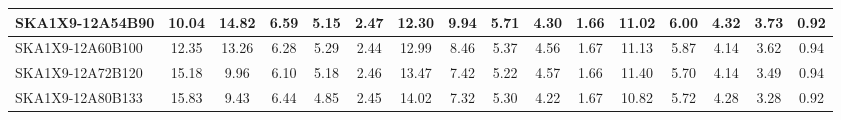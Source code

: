 \begin{table}[H]
{{\begin{tabular}{|lccccc||ccccc||ccccc|}
SKA1X9-12A54B90 & 10.04 \cellcolor{blue!21.46} & 14.82 \cellcolor{red!60.00} & 6.59 \cellcolor{green!50.16} & 5.15 \cellcolor{orange!37.09} & 2.47 \cellcolor{purple!27.69} & 12.30 \cellcolor{blue!46.00} & 9.94 \cellcolor{red!60.00} & 5.71 \cellcolor{green!60.00} & 4.30 \cellcolor{orange!23.89} & 1.66 \cellcolor{purple!18.00} & 11.02 \cellcolor{blue!56.25} & 6.00 \cellcolor{red!48.73} & 4.32 \cellcolor{green!37.38} & 3.73 \cellcolor{orange!50.59} & 0.92 \cellcolor{purple!18.00}\\ \hline 
SKA1X9-12A60B100 & 12.35 \cellcolor{blue!36.84} & 13.26 \cellcolor{red!49.03} & 6.28 \cellcolor{green!29.81} & 5.29 \cellcolor{orange!46.00} & 2.44 \cellcolor{purple!18.00} & 12.99 \cellcolor{blue!51.62} & 8.46 \cellcolor{red!36.27} & 5.37 \cellcolor{green!30.86} & 4.56 \cellcolor{orange!43.05} & 1.67 \cellcolor{purple!22.20} & 11.13 \cellcolor{blue!57.34} & 5.87 \cellcolor{red!35.41} & 4.14 \cellcolor{green!18.00} & 3.62 \cellcolor{orange!42.62} & 0.94 \cellcolor{purple!28.50}\\ \hline 
SKA1X9-12A72B120 & 15.18 \cellcolor{blue!55.67} & 9.96 \cellcolor{red!25.81} & 6.10 \cellcolor{green!18.00} & 5.18 \cellcolor{orange!39.00} & 2.46 \cellcolor{purple!24.46} & 13.47 \cellcolor{blue!55.52} & 7.42 \cellcolor{red!19.60} & 5.22 \cellcolor{green!18.00} & 4.57 \cellcolor{orange!43.79} & 1.66 \cellcolor{purple!18.00} & 11.40 \cellcolor{blue!60.00} & 5.70 \cellcolor{red!18.00} & 4.14 \cellcolor{green!18.00} & 3.49 \cellcolor{orange!33.21} & 0.94 \cellcolor{purple!28.50}\\ \hline 
SKA1X9-12A80B133 & 15.83 \cellcolor{blue!60.00} & 9.43 \cellcolor{red!22.08} & 6.44 \cellcolor{green!40.31} & 4.85 \cellcolor{orange!18.00} & 2.45 \cellcolor{purple!21.23} & 14.02 \cellcolor{blue!60.00} & 7.32 \cellcolor{red!18.00} & 5.30 \cellcolor{green!24.86} & 4.22 \cellcolor{orange!18.00} & 1.67 \cellcolor{purple!22.20} & 10.82 \cellcolor{blue!54.28} & 5.72 \cellcolor{red!20.05} & 4.28 \cellcolor{green!33.08} & 3.28 \cellcolor{orange!18.00} & 0.92 \cellcolor{purple!18.00}\\ \hline 
\end{tabular}}
\vspace{-0.300000cm}
\hspace{1cm} 
}
\end{table}
